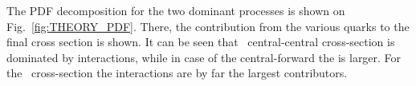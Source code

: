 \begin{figure}
\end{figure}

The PDF decomposition for the two dominant processes is shown on Fig.~\ref{fig:THEORY_PDF}. There, the contribution from the various quarks to the final cross section is shown. It can be seen that \Zee\ central-central cross-section is dominated by  interactions, while in case of the central-forward the  is larger. For the \gee\ cross-section the  interactions are by far the largest contributors.

